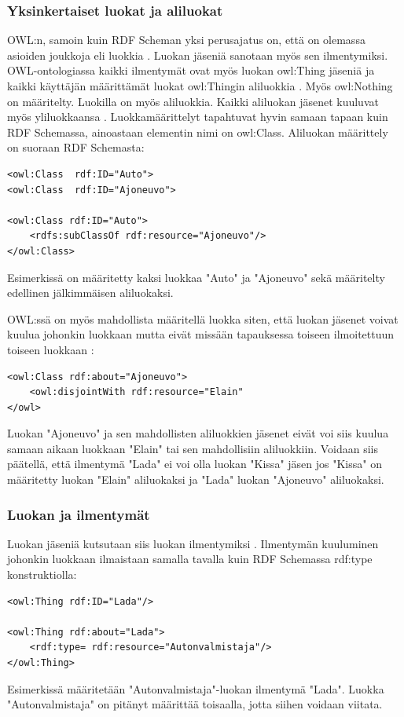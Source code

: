 \documentclass[finnish]{tktltiki2}
\theoremstyle{definition}
\theoremstyle{remark}
\begin{document}
\subsubsection{Yksinkertaiset luokat ja aliluokat}
OWL:n, samoin kuin RDF Scheman yksi perusajatus on, että on olemassa asioiden joukkoja eli luokkia \cite{SWM04}. Luokan jäseniä sanotaan myös sen ilmentymiksi. OWL-ontologiassa kaikki ilmentymät ovat myös luokan owl:Thing jäseniä ja kaikki käyttäjän määrittämät luokat owl:Thingin aliluokkia \cite{SWM04}. Myös owl:Nothing on määritelty. Luokilla on myös aliluokkia. Kaikki aliluokan jäsenet kuuluvat myös yliluokkaansa \cite{SWM04}. Luokkamäärittelyt tapahtuvat hyvin samaan tapaan kuin RDF Schemassa, ainoastaan elementin nimi on owl:Class. Aliluokan määrittely on suoraan RDF Schemasta:
\begin{verbatim}
<owl:Class  rdf:ID="Auto">
<owl:Class  rdf:ID="Ajoneuvo">

<owl:Class rdf:ID="Auto">
    <rdfs:subClassOf rdf:resource="Ajoneuvo"/>
</owl:Class>
\end{verbatim}
Esimerkissä on määritetty kaksi luokkaa "Auto" ja "Ajoneuvo" sekä määritelty edellinen jälkimmäisen aliluokaksi. 

OWL:ssä on myös mahdollista määritellä luokka siten, että luokan jäsenet voivat kuulua johonkin luokkaan mutta eivät missään tapauksessa toiseen ilmoitettuun toiseen luokkaan \cite{SWM04}:
\begin{verbatim}
<owl:Class rdf:about="Ajoneuvo">
    <owl:disjointWith rdf:resource="Elain"
</owl>
\end{verbatim}
Luokan "Ajoneuvo" ja sen mahdollisten aliluokkien jäsenet eivät voi siis kuulua samaan aikaan luokkaan "Elain" tai sen mahdollisiin aliluokkiin. Voidaan siis päätellä, että ilmentymä "Lada" ei voi olla luokan "Kissa" jäsen jos "Kissa" on määritetty luokan "Elain" aliluokaksi ja "Lada" luokan "Ajoneuvo" aliluokaksi. 

\subsubsection{Luokan ja ilmentymät}
Luokan jäseniä kutsutaan siis luokan ilmentymiksi \cite{SWM04}. Ilmentymän kuuluminen johonkin luokkaan ilmaistaan samalla tavalla kuin RDF Schemassa rdf:type konstruktiolla:
\begin{verbatim}
<owl:Thing rdf:ID="Lada"/>

<owl:Thing rdf:about="Lada">
    <rdf:type= rdf:resource="Autonvalmistaja"/>
</owl:Thing>
\end{verbatim} 
Esimerkissä määritetään "Autonvalmistaja"-luokan ilmentymä "Lada". Luokka "Autonvalmistaja" on pitänyt määrittää toisaalla, jotta siihen voidaan viitata. 
\end{document}

